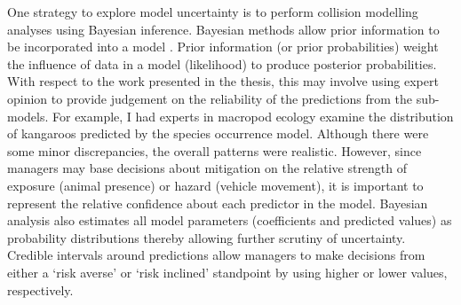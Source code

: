 One strategy to explore model uncertainty is to perform collision modelling analyses using Bayesian inference. Bayesian methods allow prior information to be incorporated into a model \citep{mcca07}. Prior information (or prior probabilities) weight the influence of data in a model (likelihood) to produce posterior probabilities. With respect to the work presented in the thesis, this may involve using expert opinion to provide judgement on the reliability of the predictions from the sub-models. For example, I had experts in macropod ecology examine the distribution of kangaroos predicted by the species occurrence model. Although there were some minor discrepancies, the overall patterns were realistic. However, since managers may base decisions about mitigation on the relative strength of exposure (animal presence) or hazard (vehicle movement), it is important to represent the relative confidence about each predictor in the model. Bayesian analysis also estimates all model parameters (coefficients and predicted values) as probability distributions thereby allowing further scrutiny of uncertainty. Credible intervals around predictions allow managers to make decisions from either a `risk averse' or `risk inclined' standpoint by using higher or lower values, respectively. 

